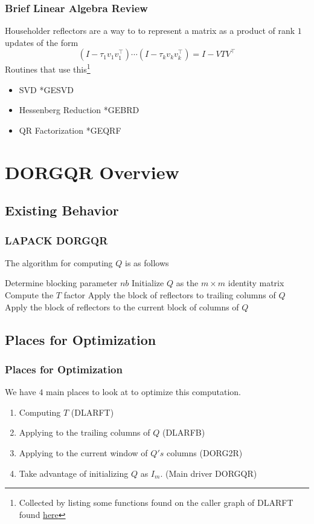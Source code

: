 \documentclass[12pt]{beamer}
\begin{document}
    \begin{frame}
        \frametitle{Brief Linear Algebra Review}
        Householder reflectors are a way to to represent a matrix as a product of rank $1$ updates of the form
        $$
            \left(I - \tau_1 v_1v_1^\top\right)\cdots\left(I - \tau_k v_kv_k^\top\right) = I - VTV^\top
        $$
        Routines that use this\footnote{Collected by listing some functions found on the caller graph of DLARFT found \textcolor{blue}{\href{https://netlib.org/lapack/explore-html//d7/d0d/group__larft_ga20e5a4f351b3ca7d30078547e55884f5_ga20e5a4f351b3ca7d30078547e55884f5_icgraph_org.svg}{here}}}
        \begin{itemize}
            \item SVD *GESVD
            \item Hessenberg Reduction *GEBRD
            \item QR Factorization *GEQRF
        \end{itemize}
    \end{frame}
    \section{DORGQR Overview}
    \subsection{Existing Behavior}
    \begin{frame}
        \frametitle{LAPACK DORGQR}
        The algorithm for computing $Q$ is as follows
        \begin{algorithmic}
            \State Determine blocking parameter $nb$
            \State Initialize $Q$ as the $m\times m$ identity matrix
            \State Compute the $T$ factor
            \State Apply the block of reflectors to trailing columns of $Q$
            \State Apply the block of reflectors to the current block of columns of $Q$
            \EndFor
        \end{algorithmic}
    \end{frame}
    \subsection{Places for Optimization}
    \begin{frame}
        \frametitle{Places for Optimization}
        We have $4$ main places to look at to optimize this computation.
        \begin{enumerate}
            \item Computing $T$ (DLARFT)
            \item Applying to the trailing columns of $Q$ (DLARFB)
            \item Applying to the current window of $Q's$ columns (DORG2R)
            \item Take advantage of initializing $Q$ as $I_m$. (Main driver DORGQR)
        \end{enumerate}
    \end{frame}
\end{document}
